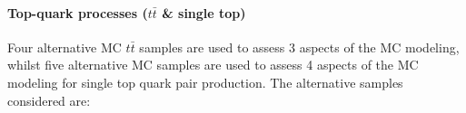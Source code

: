  
 
 
 
 
\paragraph{Top-quark processes ($t \bar{t}$ \& single top) }
\label{sec:boosted_syst_modeling_top}
 
Four alternative MC $t \bar{t}$ samples are used to assess 3 aspects of the MC modeling,
whilst five alternative MC samples are used to assess 4 aspects of the MC modeling for
single top quark pair production. The alternative samples considered are:
 
